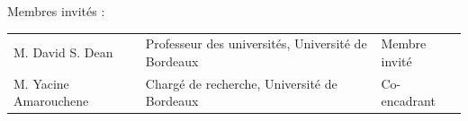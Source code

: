 \documentclass[french,12pt,a4paper]{report}
\begin{document}
\noindent Membres invités :

\vspace{0.15cm}

\begin{center}
\small
\setlength{\tabcolsep}{5pt}
\renewcommand{\arraystretch}{1.15}

\begin{tabular}{lll}
M. David S. Dean
    & Professeur des universités, Université de Bordeaux
    & Membre invité \\
M. Yacine Amarouchene
    & Chargé de recherche, Université de Bordeaux
    & Co-encadrant
\end{tabular}
\end{center}
\end{document}

